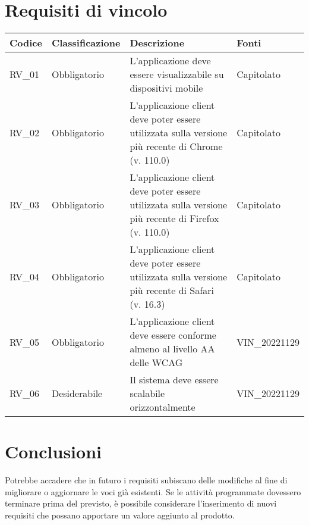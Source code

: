 \section{Requisiti di vincolo}

\begin{center}
    \begin{xltabular}{\linewidth}{|l|l|X|l|}
    \hline
    \textbf{Codice} & \textbf{Classificazione} & \textbf{Descrizione} & \textbf{Fonti} \\
    \hline
    RV\_01 & Obbligatorio & L'applicazione deve essere visualizzabile su dispositivi mobile & Capitolato \\

    \hline
    RV\_02 & Obbligatorio & L'applicazione client deve poter essere utilizzata sulla versione più recente di Chrome (v. 110.0) & Capitolato \\

    \hline
    RV\_03 & Obbligatorio & L'applicazione client deve poter essere utilizzata sulla versione più recente di Firefox (v. 110.0) & Capitolato \\

    \hline
    RV\_04 & Obbligatorio & L'applicazione client deve poter essere utilizzata sulla versione più recente di Safari (v. 16.3) & Capitolato \\

    \hline
    RV\_05 & Obbligatorio & L'applicazione client deve essere conforme almeno al livello AA delle WCAG  & VIN\_20221129 \\

    \hline
    RV\_06 & Desiderabile & Il sistema deve essere scalabile orizzontalmente  & VIN\_20221129 \\

    \hline

    \end{xltabular}
    \end{center}

\section{Conclusioni}

Potrebbe accadere che in futuro i requisiti subiscano delle modifiche al fine di migliorare o aggiornare le voci già esistenti.
Se le attività programmate dovessero terminare prima del previsto, è possibile considerare l'inserimento di nuovi requisiti che possano apportare un valore aggiunto al prodotto.